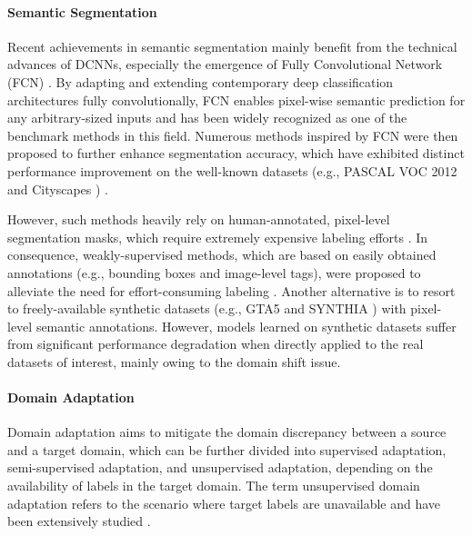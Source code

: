\documentclass[runningheads]{llncs}
\begin{document}
	\paragraph{\textbf{Semantic Segmentation}} Recent achievements in semantic segmentation mainly benefit from the technical advances of DCNNs, especially the emergence of Fully Convolutional Network (FCN) \cite{long2015fully}. By adapting and extending contemporary deep classification architectures fully convolutionally, FCN enables pixel-wise semantic prediction for any arbitrary-sized inputs and has been widely recognized as one of the benchmark methods in this field. Numerous methods inspired by FCN were then proposed to further enhance segmentation accuracy, which have exhibited distinct performance improvement on the well-known datasets (e.g., PASCAL VOC 2012 \cite{pascal-voc-2012} and Cityscapes \cite{cordts2016cityscapes}) \cite{chen2014semantic,liu2015semantic,zhao2017pyramid,chen2018deeplab,chen2018searching}.
	
	However, such methods heavily rely on human-annotated, pixel-level segmentation masks, which require extremely expensive labeling efforts \cite{cordts2016cityscapes}. In consequence, weakly-supervised methods, which are based on easily obtained annotations (e.g., bounding boxes and image-level tags), were proposed to alleviate the need for effort-consuming labeling \cite{dai2015boxsup,pinheiro2015image}. Another alternative is to resort to freely-available synthetic datasets (e.g., GTA5 \cite{richter2016playing} and SYNTHIA \cite{ros2016synthia}) with pixel-level semantic annotations. However, models learned on synthetic datasets suffer from significant performance degradation when directly applied to the real datasets of interest, mainly owing to the domain shift issue. 
	
	\paragraph{{\bf Domain Adaptation}} Domain adaptation aims to mitigate the domain discrepancy between a source and a target domain, which can be further divided into supervised adaptation, semi-supervised adaptation, and unsupervised adaptation, depending on the availability of labels in the target domain. The term unsupervised domain adaptation refers to the scenario where target labels are unavailable and have been extensively studied \cite{long2015learning,tzeng2014deep,ganin2014unsupervised,tzeng2015simultaneous,tzeng2017adversarial,ying2018transfer,zhang2019collaborative}.
	
\end{document}
